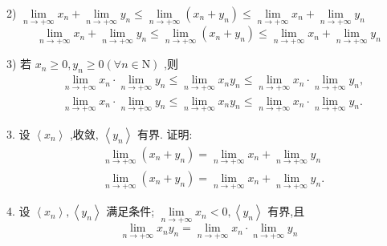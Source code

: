 2) $\mathop{\lim }\limits_{{n \rightarrow   + \infty }}{x}_{n} + \mathop{\lim }\limits_{{n \rightarrow   + \infty }}{y}_{n} \leq  \mathop{\lim }\limits_{{n \rightarrow   + \infty }}\left( {{x}_{n} + {y}_{n}}\right)  \leq  \mathop{\lim }\limits_{{n \rightarrow   + \infty }}{x}_{n} + \mathop{\lim }\limits_{{n \rightarrow   + \infty }}{y}_{n}$
$$\mathop{\lim }\limits_{{n \rightarrow   + \infty }}{x}_{n} + \mathop{\lim }\limits_{{n \rightarrow   + \infty }}{y}_{n} \leq  \mathop{\lim }\limits_{{n \rightarrow   + \infty }}\left( {{x}_{n} + {y}_{n}}\right)  \leq  \mathop{\lim }\limits_{{n \rightarrow   + \infty }}{x}_{n} + \mathop{\lim }\limits_{{n \rightarrow   + \infty }}{y}_{n}$$

3) 若 ${x}_{n} \geq  0,{y}_{n} \geq  0\left( {\forall n \in  \mathrm{N}}\right)$ ,则
\begin{align*}
	&\mathop{\lim }\limits_{{n \rightarrow   + \infty }}{x}_{n} \cdot  \mathop{\lim }\limits_{{n \rightarrow   + \infty }}{y}_{n} \leq  \mathop{\lim }\limits_{{n \rightarrow   + \infty }}{x}_{n}{y}_{n} \leq  \mathop{\lim }\limits_{{n \rightarrow   + \infty }}{x}_{n} \cdot  \mathop{\lim }\limits_{{n \rightarrow   + \infty }}{y}_{n},\\
	&\mathop{\lim }\limits_{{n \rightarrow   + \infty }}{x}_{n} \cdot  \mathop{\lim }\limits_{{n \rightarrow   + \infty }}{y}_{n} \leq  \mathop{\lim }\limits_{{n \rightarrow   + \infty }}{x}_{n}{y}_{n} \leq  \mathop{\lim }\limits_{{n \rightarrow   + \infty }}{x}_{n} \cdot  \mathop{\lim }\limits_{{n \rightarrow   + \infty }}{y}_{n}.
\end{align*}

3. 设 $\left\langle  {x}_{n}\right\rangle$ ,收敛, $\left\langle  {y}_{n}\right\rangle$ 有界. 证明:
\begin{align*}
	&\mathop{\lim }\limits_{{n \rightarrow   + \infty }}\left( {{x}_{n} + {y}_{n}}\right)  = \mathop{\lim }\limits_{{n \rightarrow   + \infty }}{x}_{n} + \mathop{\lim }\limits_{{n \rightarrow   + \infty }}{y}_{n}\\
	&\mathop{\lim }\limits_{{n \rightarrow   + \infty }}\left( {{x}_{n} + {y}_{n}}\right)  = \mathop{\lim }\limits_{{n \rightarrow   + \infty }}{x}_{n} + \mathop{\lim }\limits_{{n \rightarrow   + \infty }}{y}_{n}.
\end{align*}

4. 设 $\left\langle  {x}_{n}\right\rangle  ,\left\langle  {y}_{n}\right\rangle$ 满足条件; $\mathop{\lim }\limits_{{n \rightarrow   + \infty }}{x}_{n} < 0,\left\langle  {y}_{n}\right\rangle$ 有界,且
$$\mathop{\lim }\limits_{{n \rightarrow   + \infty }}{x}_{n}{y}_{n} = \mathop{\lim }\limits_{{n \rightarrow   + \infty }}{x}_{n} \cdot  \mathop{\lim }\limits_{{n \rightarrow   + \infty }}{y}_{n}$$

